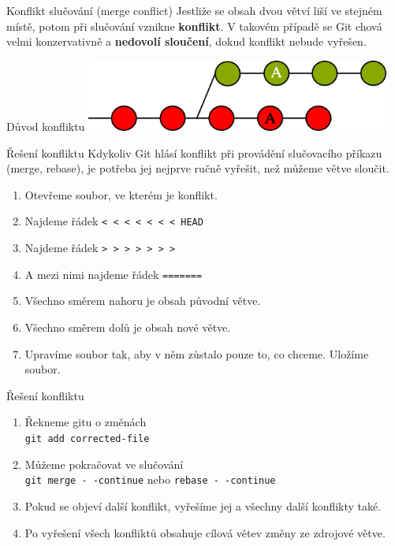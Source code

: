 \documentclass[14pt]{beamer}
\renewcommand{\texttt}[1]{{{\tt\color{blue}#1}}}
\begin{document}
	\begin{frame}{Konflikt slučování (merge conflict)}
	Jestliže se obsah dvou větví liší ve stejném místě, potom při slučování vznikne \textbf{konflikt}. V takovém případě se Git chová velmi konzervativně a \textbf{nedovolí sloučení}, dokud konflikt nebude vyřešen.
	\end{frame}

	\begin{frame}{Důvod konfliktu}
	\includegraphics[width=10cm]{images/conflict}
	\end{frame}
	

	\begin{frame}{Řešení konfliktu}
		Kdykoliv Git hlásí konflikt při provádění slučovacího příkazu (merge, rebase), je potřeba jej nejprve ručně vyřešit, než můžeme větve sloučit.
		\begin{enumerate}
			\item Otevřeme soubor, ve kterém je konflikt.
			\item Najdeme řádek \texttt{<\,<\,<\,<\,<\,<\,< HEAD}
			\item Najdeme řádek \texttt{>\,>\,>\,>\,>\,>\,>}
			\item A mezi nimi najdeme řádek \texttt{=======}
			\item Všechno směrem nahoru je obsah původní větve.
			\item Všechno směrem dolů je obsah nové větve.
			\item Upravíme soubor tak, aby v něm zůstalo pouze to, co chceme. Uložíme soubor.
		\end{enumerate}
	\end{frame}

	\begin{frame}{Řešení konfliktu}
	
	\begin{enumerate}
		\item Řekneme gitu o změnách\\
		\texttt{git add corrected-file}
		\item Můžeme pokračovat ve slučování \\
		\texttt{git merge -\,-continue} nebo \texttt{rebase -\,-continue}
		\item Pokud se objeví další konflikt, vyřešíme jej a všechny další konflikty také.
		\item Po vyřešení všech konfliktů obsahuje cílová větev změny ze zdrojové větve.
	\end{enumerate}
	\end{frame}
\end{document}
